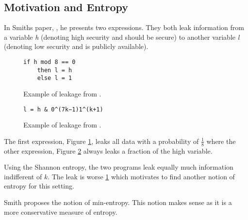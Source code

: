 \subsection{Motivation and Entropy}
In Smiths paper, \cite{Smith:2009}, he presents two expressions.
They both leak information from a variable \emph{h} (denoting
high security and should be secure) to another variable \emph{l} (denoting
low security and is publicly available).

\begin{figure}[H]
\begin{verbatim}
if h mod 8 == 0
    then l = h
    else l = 1
\end{verbatim}
\caption{Example of leakage from \cite{Smith:2009}.}
\label{code:leak-1}
\end{figure}

\begin{figure}[H]
\begin{verbatim}
l = h & 0^(7k−1)1^(k+1)
\end{verbatim}
\caption{Example of leakage from \cite{Smith:2009}.}
\label{code:leak-2}
\end{figure}

The first expression, Figure \ref{code:leak-1}, leaks all
data with a probability of $\frac{1}{8}$ where the other
expression, Figure \ref{code:leak-2} always leaks a fraction
of the high variable.

Using the Shannon entropy, the two programs leak equally much
information indifferent of $k$. The leak is worse \ref{code:leak-1} which motivates to
find another notion of entropy for this setting.

Smith proposes the notion of min-entropy. This notion makes sense as it
is a more conservative measure of entropy.
